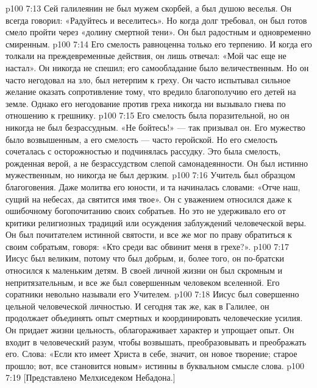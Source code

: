 \vs p100 7:13 Сей галилеянин не был мужем скорбей, а был душою веселья. Он всегда говорил: «Радуйтесь и веселитесь». Но когда долг требовал, он был готов смело пройти через «долину смертной тени». Он был радостным и одновременно смиренным.
\vs p100 7:14 Его смелость равноценна только его терпению. И когда его толкали на преждевременные действия, он лишь отвечал: «Мой час еще не настал». Он никогда не спешил; его самообладание было величественным. Но он часто негодовал на зло, был нетерпим к греху. Он часто испытывал сильное желание оказать сопротивление тому, что вредило благополучию его детей на земле. Однако его негодование против греха никогда ни вызывало гнева по отношению к грешнику.
\vs p100 7:15 Его смелость была поразительной, но он никогда не был безрассудным. «Не бойтесь!» --- так призывал он. Его мужество было возвышенным, а его смелость --- часто геройской. Но его смелость сочеталась с осторожностью и подчинялась рассудку. Это была смелость, рожденная верой, а не безрассудством слепой самонадеянности. Он был истинно мужественным, но никогда не был дерзким.
\vs p100 7:16 Учитель был образцом благоговения. Даже молитва его юности, и та начиналась словами: «Отче наш, сущий на небесах, да святится имя твое». Он с уважением относился даже к ошибочному богопочитанию своих собратьев. Но это не удерживало его от критики религиозных традиций или осуждения заблуждений человеческой веры. Он был почитателем истинной святости, и все же мог по праву обратиться к своим собратьям, говоря: «Кто среди вас обвинит меня в грехе?».
\vs p100 7:17 Иисус был великим, потому что был добрым, и, более того, он по\hyp{}братски относился к маленьким детям. В своей личной жизни он был скромным и непритязательным, и все же был совершенным человеком вселенной. Его соратники невольно называли его Учителем.
\vs p100 7:18 Иисус был совершенно цельной человеческой личностью. И сегодня так же, как в Галилее, он продолжает объединять опыт смертных и координировать человеческие усилия. Он придает жизни цельность, облагораживает характер и упрощает опыт. Он входит в человеческий разум, чтобы возвышать, преобразовывать и преображать его. Слова: «Если кто имеет Христа в себе, значит, он новое творение; старое прошло; вот, все становится новым» истинны в буквальном смысле слова.
\vsetoff
\vs p100 7:19 [Представлено Мелхиседеком Небадона.]
